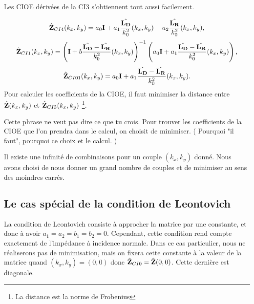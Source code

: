     Les CIOE dérivées de la CI3 s'obtiennent tout aussi facilement.

    \begin{equation*}
        \hat{\mathbf{Z}}_{CI4}(k_x,k_y) = a_0 \mathbf{I} + a_1 \dfrac{\hat{\mathbf{L_D}}}{k_0^2}(k_x,k_y) - a_2 \dfrac{\hat{\mathbf{L_R}}}{k_0^2}(k_x,k_y),
    \end{equation*}
    \begin{equation*}
        \hat{\mathbf{Z}}_{CI1}(k_x,k_y) =  \left(\mathbf{I} + b \dfrac{\hat{\mathbf{L_D}} - \hat{\mathbf{L_R}}}{k_0^2}(k_x,k_y) \right)^{-1}\left(a_0\mathbf{I} + a_1 \dfrac{\hat{\mathbf{L_D}} - \hat{\mathbf{L_R}}}{k_0^2}(k_x,k_y) \right),
    \end{equation*}
    \begin{equation*}
        \hat{\mathbf{Z}}_{CI01}(k_x,k_y) =  a_0\mathbf{I} + a_1 \dfrac{\hat{\mathbf{L_D}} - \hat{\mathbf{L_R}}}{k_0^2}(k_x,k_y).
    \end{equation*}
    Pour calculer les coefficients de la CIOE, il faut minimiser la distance entre \(\hat{\mathbf{Z}}(k_x,k_y)\) et \(\hat{\mathbf{Z}}_{CI3}(k_x,k_y)\) \footnote{La distance est la norme de Frobenius}.
    \begin{REM}
      Cette phrase ne veut pas dire ce que tu crois. Pour trouver les coefficients de la CIOE que l'on prendra dans le calcul, on choisit de minimiser. ( Pourquoi "il faut", pourquoi ce choix et le calcul. )
    \end{REM}
    Il existe une infinité de combinaisons pour un couple \((k_x,k_y)\) donné. Nous avons choisi de nous donner un grand nombre de couples et de minimiser au sens des moindres carrés.

  \subsection{Le cas spécial de la condition de Leontovich}

    La condition de Leontovich consiste à approcher la matrice par une constante, et donc à avoir \(a_1=a_2=b_1=b_2=0\). Cependant, cette condition rend compte exactement de l'impédance à incidence normale. Dans ce cas particulier, nous ne réaliserons pas de minimisation, mais on fixera cette constante à la valeur de la matrice quand \((k_x,k_y) = (0,0)\) donc \( \hat{\mathbf{Z}}_{CI0}  = \hat{\mathbf{Z}}(0,0)\). Cette dernière est diagonale.
